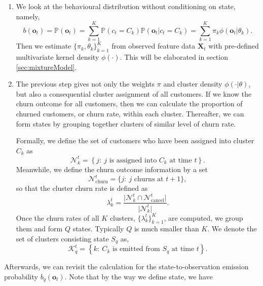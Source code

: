 \begin{enumerate}
\item We look at the behavioural distribution without conditioning on state, namely,
\begin{equation}
b(\mathbf{o}_t) = \mathbb{P} (\mathbf{o}_t) = \sum_{k=1}^K \mathbb{P} (c_t = C_k) \mathbb{P} (\mathbf{o}_t | c_t = C_k) = \sum_{k=1}^K \pi_k \phi(\mathbf{o}_t | \theta_k).
\label{eq:bo}
\end{equation}
Then we estimate $\{ \pi_k, \theta_k \}_{k=1}^K$ from observed feature data $\mathbf{X}_t$ with pre-defined multivariate kernel density $\phi(\cdot)$. This will be elaborated in section \ref{sec:mixtureModel}.

\item The previous step gives not only the weights $\pi$ and cluster density $\phi(\cdot | \theta)$, but also a consequential cluster assignment of all customers. If we know the churn outcome for all customers, then we can calculate the proportion of churned customers, or churn rate, within each cluster. Thereafter, we can form states by grouping together clusters of similar level of churn rate.

Formally, we define the set of customers who have been assigned into cluster $C_k$ as
\begin{equation}
\mathcal{N}_k^t = \left\lbrace j :~ j \text{ is assigned into } C_k \text{ at time } t \right\rbrace.
\end{equation}
Meanwhile, we define the churn outcome information by a set
\begin{equation}
\mathcal{N}_\text{churn}^t = \{j: ~j \text{ churns at } t+1 \},
\end{equation}
so that the cluster churn rate is defined as
\begin{equation}
\lambda_k^t = \frac{\vert \mathcal{N}_k^t \cap \mathcal{N}_\text{cancel}^t \vert}{\vert  \mathcal{N}_k^t \vert}.
\label{eq:clusterChurn}
\end{equation}
Once the churn rates of all $K$ clusters, $\{ \lambda_k^t \}_{k=1}^K$, are computed, we group them and form $Q$ states. Typically $Q$ is much smaller than $K$. We denote the set of clusters consisting state $S_q$ as,
\begin{equation}
\mathcal{K}_q^t = \left\lbrace k :~ C_k \text{ is emitted from } S_q \text{ at time } t \right\rbrace.
\end{equation}
\end{enumerate}
Afterwards, we can revisit the calculation for the state-to-observation emission probability $b_q(\mathbf{o}_t)$. Note that by the way we define state, we have
